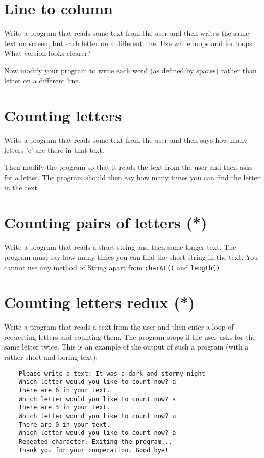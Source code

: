 \documentclass{article}
\begin{document}
\section{Line to column}
\label{sec:line-column}

Write a program that reads some text from the user and then writes the
same text on screen, but each letter on a different line. 
Use while loops and for loops. What version looks clearer?

Now modify your program to write each word (as defined by spaces)
rather than letter on a different line. 

\section{Counting letters}
\label{sec:counting-letters}

Write a program that reads some text from the user and then says how
many letters 'e' are there in that text. 

Then modify the program so that it reads the text from the user and
then asks for a letter. The program should then say how many times you
can find the letter in the text. 

\section{Counting pairs of letters (*)}
\label{sec:count-pairs-lett}

Write a program that reads a short string and then some longer
text. The program must say how many times you can find the short string in the
text. You cannot use any method of String apart from \verb+charAt()+
and \verb+length()+. 

\section{Counting letters redux (*)}
\label{sec:count-lett-redux}

Write a program that reads a text from the user and then enter a loop
of requesting letters and counting them. The program stops if the user
asks for the same letter twice. This is an example of the output of
such a program (with a rather short and boring text): 

\begin{verbatim}
    Please write a text: It was a dark and stormy night
    Which letter would you like to count now? a
    There are 6 in your text. 
    Which letter would you like to count now? s
    There are 3 in your text. 
    Which letter would you like to count now? u
    There are 0 in your text. 
    Which letter would you like to count now? a
    Repeated character. Exiting the program...
    Thank you for your cooperation. Good bye!
\end{verbatim}
\end{document}

